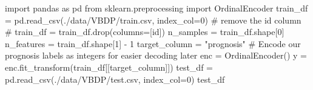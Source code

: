 \documentclass[
  letterpaper,
  DIV=11,
  numbers=noendperiod]{scrreprt}
\newenvironment{Shaded}{\begin{snugshade}}{\end{snugshade}}
\newcommand{\CommentTok}[1]{\textcolor[rgb]{0.37,0.37,0.37}{#1}}
\newcommand{\DecValTok}[1]{\textcolor[rgb]{0.68,0.00,0.00}{#1}}
\newcommand{\ImportTok}[1]{\textcolor[rgb]{0.00,0.46,0.62}{#1}}
\newcommand{\NormalTok}[1]{\textcolor[rgb]{0.00,0.23,0.31}{#1}}
\newcommand{\OperatorTok}[1]{\textcolor[rgb]{0.37,0.37,0.37}{#1}}
\newcommand{\StringTok}[1]{\textcolor[rgb]{0.13,0.47,0.30}{#1}}
\begin{document}
\begin{Shaded}
\begin{Highlighting}[]
\ImportTok{import}\NormalTok{ pandas }\ImportTok{as}\NormalTok{ pd}
\ImportTok{from}\NormalTok{ sklearn.preprocessing }\ImportTok{import}\NormalTok{ OrdinalEncoder}
\NormalTok{train\_df }\OperatorTok{=}\NormalTok{ pd.read\_csv(}\StringTok{\textquotesingle{}./data/VBDP/train.csv\textquotesingle{}}\NormalTok{, index\_col}\OperatorTok{=}\DecValTok{0}\NormalTok{)}
\CommentTok{\# remove the id column}
\CommentTok{\# train\_df = train\_df.drop(columns=[\textquotesingle{}id\textquotesingle{}])}
\NormalTok{n\_samples }\OperatorTok{=}\NormalTok{ train\_df.shape[}\DecValTok{0}\NormalTok{]}
\NormalTok{n\_features }\OperatorTok{=}\NormalTok{ train\_df.shape[}\DecValTok{1}\NormalTok{] }\OperatorTok{{-}} \DecValTok{1}
\NormalTok{target\_column }\OperatorTok{=} \StringTok{"prognosis"}
\CommentTok{\# Encode our prognosis labels as integers for easier decoding later}
\NormalTok{enc }\OperatorTok{=}\NormalTok{ OrdinalEncoder()}
\NormalTok{y }\OperatorTok{=}\NormalTok{ enc.fit\_transform(train\_df[[target\_column]])}
\NormalTok{test\_df }\OperatorTok{=}\NormalTok{ pd.read\_csv(}\StringTok{\textquotesingle{}./data/VBDP/test.csv\textquotesingle{}}\NormalTok{, index\_col}\OperatorTok{=}\DecValTok{0}\NormalTok{)}
\NormalTok{test\_df}
\end{Highlighting}
\end{Shaded}
\end{document}
